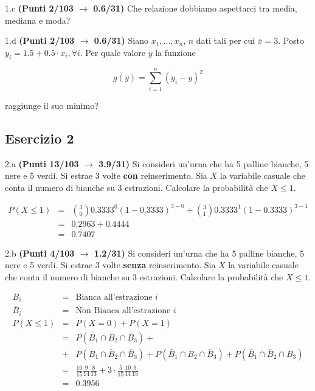 \documentclass[
  11pt,
]{book}
\theoremstyle{mytheoremstyle}
\theoremstyle{mydefstyle}
\newenvironment{sol}
  {
  \begin{tcolorbox}[enhanced,breakable,arc=0.1mm,boxrule=1pt,colback=white,colframe=iblue,
  title=\bf \fontfamily{lmss}\selectfont \hspace{.5 cm} Soluzione,drop fuzzy shadow]

}{
\end{tcolorbox}
  }
\begin{document}
1.c \textbf{(Punti 2/103 \(\rightarrow\) 0.6/31)} Che relazione dobbiamo aspettarci tra media, mediana e moda?

1.d \textbf{(Punti 2/103 \(\rightarrow\) 0.6/31)} Siano \(x_1,...,x_n\), \(n\) dati tali per cui \(\bar x=3\). Posto \(y_i = 1.5+0.5\cdot x_i,\forall i\).
Per quale valore \(y\) la funzione

\[
g(y)=\sum_{i=1}^n (y_i- y)^2
\]

raggiunge il suo minimo?

\subsection{Esercizio 2}\label{esercizio-2-43}

2.a \textbf{(Punti 13/103 \(\rightarrow\) 3.9/31)} Si consideri un'urna che ha 5 palline bianche, 5 nere e 5 verdi. Si estrae 3 volte \textbf{con} reinserimento. Sia \(X\) la variabile casuale che conta il numero di bianche su 3 estrazioni. Calcolare la probabilità che \(X\leq 1\).

\begin{sol}
\normalsize 
\begin{eqnarray*}
      P( X \leq 1 ) &=& \binom{ 3 }{ 0 } 0.3333 ^{ 0 }(1- 0.3333 )^{ 3 - 0 }+\binom{ 3 }{ 1 } 0.3333 ^{ 1 }(1- 0.3333 )^{ 3 - 1 } \\                 &=& 0.2963+0.4444 \\                 &=& 0.7407 
   \end{eqnarray*}
\normalsize 

\end{sol}

2.b \textbf{(Punti 4/103 \(\rightarrow\) 1.2/31)} Si consideri un'urna che ha 5 palline bianche, 5 nere e 5 verdi. Si estrae 3 volte \textbf{senza} reinserimento. Sia \(X\) la variabile casuale che conta il numero di bianche su 3 estrazioni. Calcolare la probabilità che \(X\leq 1\).

\begin{sol}
\begin{eqnarray*}
  B_i &=& \text{Bianca all'estrazione $i$}\\
  \bar B_i &=& \text{Non Bianca all'estrazione $i$}\\
  P(X\le 1) &=&  P(X=0) + P(X=1)\\
   &=& P(\bar B_1\cap\bar B_2\cap\bar B_3)+\\
   &+&P(B_1\cap\bar B_2 \cap \bar B_3)+P(\bar B_1\cap B_2 \cap \bar B_3)+P(\bar B_1\cap\bar B_2 \cap B_3)\\
   &=& \frac {10}{15}\frac {9}{14}\frac {8}{13}+3\cdot\frac {5}{15}\frac {10}{14}\frac {9}{13}\\
  &=& 0.3956
\end{eqnarray*}

\end{sol}
\end{document}
